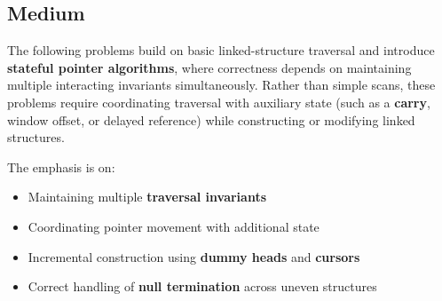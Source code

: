 \subsection{Medium}

The following problems build on basic linked-structure traversal and introduce
\textbf{stateful pointer algorithms}, where correctness depends on maintaining
multiple interacting invariants simultaneously.
Rather than simple scans, these problems require coordinating traversal with
auxiliary state (such as a \textbf{carry}, window offset, or delayed reference)
while constructing or modifying linked structures.

The emphasis is on:
\begin{itemize}[nosep]
  \item Maintaining multiple \textbf{traversal invariants}
  \item Coordinating pointer movement with additional state
  \item Incremental construction using \textbf{dummy heads} and \textbf{cursors}
  \item Correct handling of \textbf{null termination} across uneven structures
\end{itemize}


% 

% 
% 
% 

